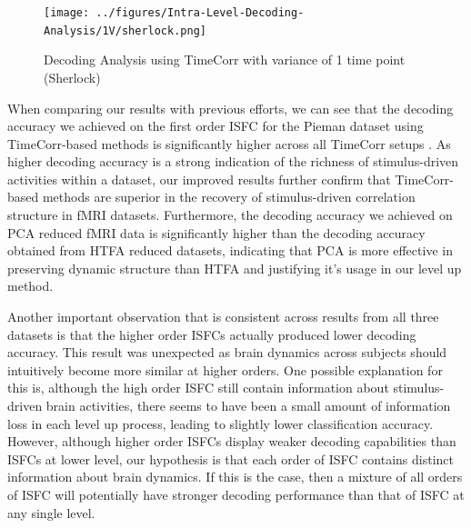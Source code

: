 \documentclass[11pt]{article}
\begin{document}
\begin{figure}[!htb]
\caption{Decoding Analysis using TimeCorr with variance of 1 time point (Sherlock)}
\centering
\texttt{[image: ../figures/Intra-Level-Decoding-Analysis/1V/sherlock.png]}
\label{fig:sherlockDC1}
\end{figure}

When comparing our results with previous efforts, we can see that the decoding accuracy we achieved on the first order ISFC for the Pieman dataset using TimeCorr-based methods is significantly higher across all TimeCorr setups \cite{jeremy2017}. As higher decoding accuracy is a strong indication of the richness of stimulus-driven activities within a dataset, our improved results further confirm that TimeCorr-based methods are superior in the recovery of stimulus-driven correlation structure in fMRI datasets. Furthermore, the decoding accuracy we achieved on PCA reduced fMRI data is significantly higher than the decoding accuracy obtained from HTFA reduced datasets, indicating that PCA is more effective in preserving dynamic structure than HTFA and justifying it's usage in our level up method.

Another important observation that is consistent across results from all three datasets is that the higher order ISFCs actually produced lower decoding accuracy. This result was unexpected as brain dynamics across subjects should intuitively become more similar at higher orders. One possible explanation for this is, although the high order ISFC still contain information about stimulus-driven brain activities, there seems to have been a small amount of information loss in each level up process, leading to slightly lower classification accuracy. However, although higher order ISFCs display weaker decoding capabilities than ISFCs at lower level, our hypothesis is that each order of ISFC contains distinct information about brain dynamics. If this is the case, then a mixture of all orders of ISFC will potentially have stronger decoding performance than that of ISFC at any single level.
\end{document}
